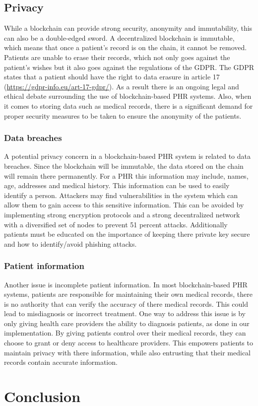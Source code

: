 \documentclass{article}
\begin{document}
\subsection{Privacy}
While a blockchain can provide strong security, anonymity and immutability, this can also be a double-edged sword. A decentralized blockchain is immutable, which means that once a patient's record is on the chain, it cannot be removed. Patients are unable to erase their records, which  not only goes against the patient's wishes but it also goes against the regulations of the GDPR. The GDPR states that a patient should have the right to data erasure in article 17 (\url{https://gdpr-info.eu/art-17-gdpr/}). As a result there is an ongoing legal and ethical debate surrounding the use of blockchain-based PHR systems. Also, when it comes to storing data such as medical records, there is a significant demand for proper security measures to be taken to ensure the anonymity of the patients.

\subsubsection{Data breaches}
A potential privacy concern in a blockchain-based PHR system is related to data breaches. Since the blockchain will be immutable, the data stored on the chain will remain there permanently. For a PHR this information may include, names, age, addresses and medical history. This information can be used to easily identify a person. Attackers may find vulnerabilities in the system which can allow them to gain access to this sensitive information. This can be avoided by implementing strong encryption protocols and a strong decentralized network with a diversified set of nodes to prevent 51 percent attacks. Additionally patients must be educated on the importance of keeping there private key secure and how to identify/avoid phishing attacks.

\subsubsection{Patient information}
Another issue is incomplete patient information. In most blockchain-based PHR systems, patients are responsible for maintaining their own medical records, there is no authority that can verify the accuracy of there medical records. This could lead to misdiagnosis or incorrect treatment. One way to address this issue is by only giving health care providers the ability to diagnosis patients, as done in our implementation. By giving patients control over their medical records, they can choose to grant or deny access to healthcare providers. This empowers patients to maintain privacy with there information, while also entrusting that their medical records contain accurate information.




\section{Conclusion}




\nocite{nakamoto2008bitcoin}
\nocite{zanbaghi_samet_2022}
\nocite{ghadamyari_samet_2020}
\printbibliography
\end{document}
